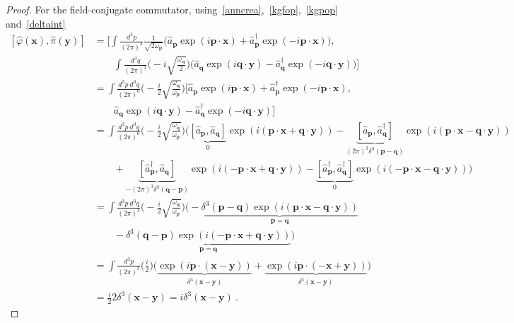 \begin{proof}
        For the field-conjugate commutator, using~\eqref{anncrea},~\eqref{kgfop},~\eqref{kgpop} and~\eqref{deltaint}
        \begin{equation*}
        \begin{aligned}
            [\hat \varphi(\mathbf x), \hat \pi (\mathbf y)] & = [\int \frac{d^3 p}{{(2\pi)}^3} \frac{1}{\sqrt{2 \omega_{\mathbf p}}} \Big (\hat a_{\mathbf p} \exp(i \mathbf p \cdot \mathbf x) + \hat a_{\mathbf p}^\dagger \exp(- i \mathbf p \cdot \mathbf x) \Big), \\ & \qquad \int \frac{d^3 q}{{(2\pi)}^3} \Big (- i \sqrt{\frac{\omega_{\mathbf q}}{2}} \Big )  \Big (\hat a_{\mathbf q} \exp(i \mathbf q \cdot \mathbf y) - \hat a_{\mathbf q}^\dagger \exp(- i \mathbf q \cdot \mathbf y) \Big)] \\ &  = \int \frac{d^3 p ~ d^3 q}{{(2\pi)}^6} \Big (- \frac{i}{2}\sqrt{\frac{\omega_{\mathbf q}}{\omega_{\mathbf p}}} \Big ) [\hat a_{\mathbf p} \exp(i \mathbf p \cdot \mathbf x) + \hat a_{\mathbf p}^\dagger \exp(- i \mathbf p \cdot \mathbf x), \\ & \qquad \hat a_{\mathbf q} \exp(i \mathbf q \cdot \mathbf y) - \hat a_{\mathbf q}^\dagger \exp(- i \mathbf q \cdot \mathbf y)] \\ & = \int \frac{d^3 p ~ d^3 q}{{(2\pi)}^6} \Big (- \frac{i}{2}\sqrt{\frac{\omega_{\mathbf q}}{\omega_{\mathbf p}}} \Big ) \Big ( \underbrace{[\hat a_{\mathbf p}, \hat a_{\mathbf q}]}_0 \exp(i (\mathbf p \cdot \mathbf x + \mathbf q \cdot \mathbf y)) - \underbrace{[\hat a_{\mathbf p}, \hat a_{\mathbf q}^\dagger]}_{(2\pi)^3 \delta^3 (\mathbf p - \mathbf q)} \exp(i (\mathbf p \cdot \mathbf x - \mathbf q \cdot \mathbf y)) \\ & \qquad + \underbrace{[\hat a_{\mathbf p}^\dagger, \hat a_{\mathbf q}]}_{- (2\pi)^3 \delta^3 (\mathbf q - \mathbf p)} \exp(i (- \mathbf p \cdot \mathbf x + \mathbf q \cdot \mathbf y)) - \underbrace{[\hat a_{\mathbf p}^\dagger, \hat a_{\mathbf q}^\dagger]}_0 \exp(i (- \mathbf p \cdot \mathbf x - \mathbf q \cdot \mathbf y))\Big) \\ & = \int \frac{d^3 p ~ d^3 q}{{(2\pi)}^3} \Big (- \frac{i}{2}\sqrt{\frac{\omega_{\mathbf q}}{\omega_{\mathbf p}}} \Big ) \Big ( - \underbrace{\delta^3 (\mathbf p - \mathbf q) \exp(i (\mathbf p \cdot \mathbf x - \mathbf q \cdot \mathbf y))}_{\mathbf p = \mathbf q} \\ & \qquad - \underbrace{\delta^3 (\mathbf q - \mathbf p) \exp(i (- \mathbf p \cdot \mathbf x + \mathbf q \cdot \mathbf y))}_{\mathbf p = \mathbf q} \Big) \\ & = \int \frac{d^3 p}{{(2\pi)}^3} \Big (\frac{i}{2} \Big ) \Big (\underbrace{\exp(i \mathbf p \cdot (\mathbf x - \mathbf y))}_{\delta^3 (\mathbf x - \mathbf y)} + \underbrace{\exp(i \mathbf p \cdot (- \mathbf x + \mathbf y))}_{\delta^3 (\mathbf x - \mathbf y)}\Big) \\ & = \frac{i}{2} 2 \delta^3 (\mathbf x - \mathbf y) = i \delta^3 (\mathbf x - \mathbf y) ~.
        \end{aligned}
        \end{equation*}
    \end{proof}

